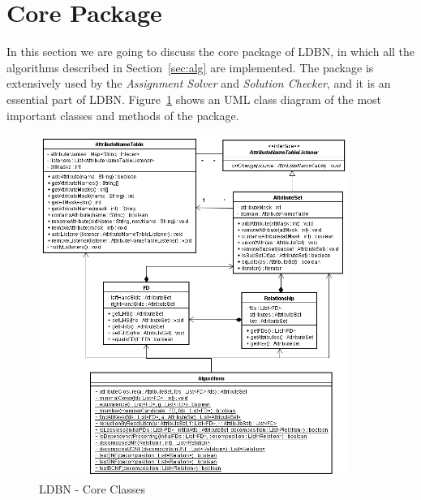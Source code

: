 \section{Core Package}
In this section we are going to discuss the core package of LDBN, in which all 
the algorithms described in Section~\ref{sec:alg} are implemented. 
The package is extensively
used by the \textit{Assignment Solver} and \textit{Solution Checker}, and it is 
an essential part of LDBN. Figure~\ref{fig:coreuml} shows an UML class diagram
of the most important classes and methods of the package. 

\begin{figure}[h]
	\begin{center}
		\includegraphics[width=0.9\textwidth]{./img/uml02.png}
		\caption{LDBN - Core Classes}
		\label{fig:coreuml}
	\end{center}
\end{figure}

